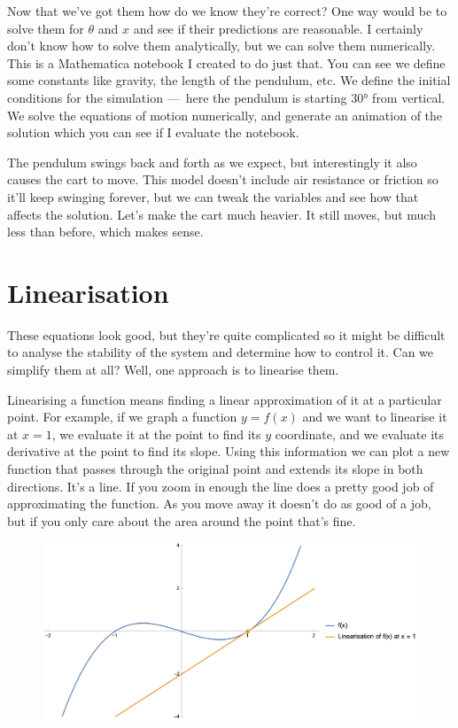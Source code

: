 \documentclass{article}
\begin{document}
Now that we've got them how do we know they're correct? One way would be to solve them for $\theta$ and $x$ and see if their predictions are reasonable. I certainly don't know how to solve them analytically, but we can solve them numerically. This is a Mathematica notebook I created to do just that. You can see we define some constants like gravity, the length of the pendulum, etc. We define the initial conditions for the simulation — here the pendulum is starting $\ang{30}$ from vertical. We solve the equations of motion numerically, and generate an animation of the solution which you can see if I evaluate the notebook.

The pendulum swings back and forth as we expect, but interestingly it also causes the cart to move. This model doesn't include air resistance or friction so it'll keep swinging forever, but we can tweak the variables and see how that affects the solution. Let's make the cart much heavier. It still moves, but much less than before, which makes sense.

\section{Linearisation}

These equations look good, but they're quite complicated so it might be difficult to analyse the stability of the system and determine how to control it. Can we simplify them at all? Well, one approach is to linearise them.

Linearising a function means finding a linear approximation of it at a particular point. For example, if we graph a function $y = f(x)$ and we want to linearise it at $x = 1$, we evaluate it at the point to find its $y$ coordinate, and we evaluate its derivative at the point to find its slope. Using this information we can plot a new function that passes through the original point and extends its slope in both directions. It's a line. If you zoom in enough the line does a pretty good job of approximating the function. As you move away it doesn't do as good of a job, but if you only care about the area around the point that's fine.

\begin{figure}[H]
  \centering
  \includegraphics[width=\textwidth]{linearisation1}
\end{figure}
\end{document}
